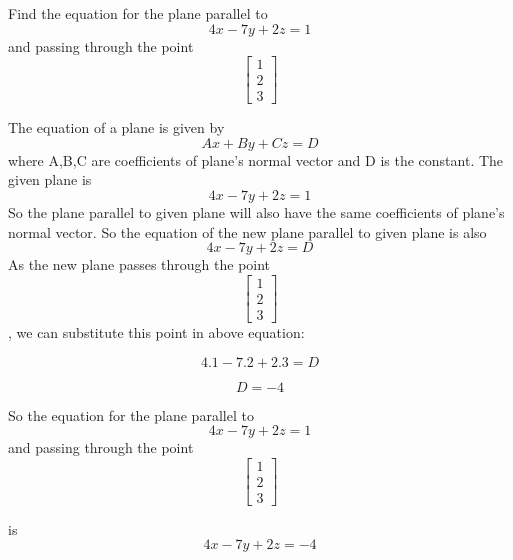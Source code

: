 Find the equation for the plane parallel to 
\[
4x-7y+2z=1
\]
and passing through the point
\[
\begin{bmatrix}
1 \\ 2 \\ 3
\end{bmatrix}
\]

The equation of a plane is given by 
\[
Ax+By+Cz=D
\]
where A,B,C are coefficients of plane's normal vector and D is the constant.
The given plane is \[
4x-7y+2z=1
\]
So the plane parallel to given plane will also have the same coefficients of plane's normal vector.
So the equation of the new plane parallel to given plane is also
\[
4x-7y+2z=D
\]
As the new plane passes through the point \[
\begin{bmatrix}
1 \\ 2 \\ 3
\end{bmatrix}
\], we can substitute this point in above equation:

\[
4.1-7.2+2.3=D
\]

\[
D=-4
\]

So the equation for the plane parallel to 
\[
4x-7y+2z=1
\]
and passing through the point
\[
\begin{bmatrix}
1 \\ 2 \\ 3
\end{bmatrix}
\]

is 
\[
4x-7y+2z=-4
\]
